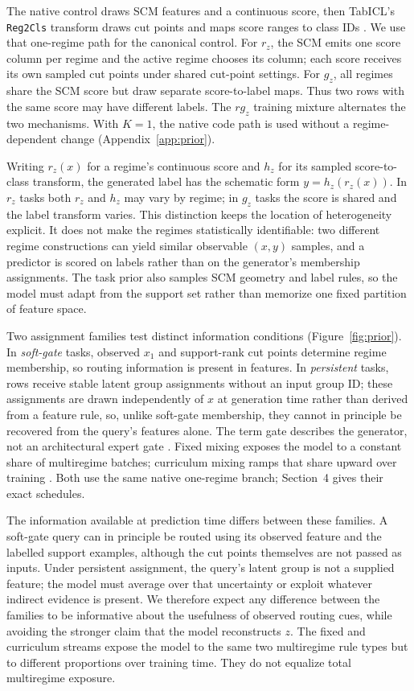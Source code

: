 \documentclass{article}
\begin{document}
The native control draws SCM features and a continuous score, then TabICL's \texttt{Reg2Cls} transform draws cut points and maps score ranges to class IDs \citep{qu2025tabicl}. We use that one-regime path for the canonical control. For $r_z$, the SCM emits one score column per regime and the active regime chooses its column; each score receives its own sampled cut points under shared cut-point settings. For $g_z$, all regimes share the SCM score but draw separate score-to-label maps. Thus two rows with the same score may have different labels. The $rg_z$ training mixture alternates the two mechanisms. With $K=1$, the native code path is used without a regime-dependent change (Appendix~\ref{app:prior}).

Writing $r_z(x)$ for a regime's continuous score and $h_z$ for its sampled score-to-class transform, the generated label has the schematic form $y=h_z(r_z(x))$. In $r_z$ tasks both $r_z$ and $h_z$ may vary by regime; in $g_z$ tasks the score is shared and the label transform varies. This distinction keeps the location of heterogeneity explicit. It does not make the regimes statistically identifiable: two different regime constructions can yield similar observable $(x,y)$ samples, and a predictor is scored on labels rather than on the generator's membership assignments. The task prior also samples SCM geometry and label rules, so the model must adapt from the support set rather than memorize one fixed partition of feature space.

Two assignment families test distinct information conditions (Figure~\ref{fig:prior}). In \emph{soft-gate} tasks, observed $x_1$ and support-rank cut points determine regime membership, so routing information is present in features. In \emph{persistent} tasks, rows receive stable latent group assignments without an input group ID; these assignments are drawn independently of $x$ at generation time rather than derived from a feature rule, so, unlike soft-gate membership, they cannot in principle be recovered from the query's features alone. The term gate describes the generator, not an architectural expert gate \citep{jacobs1991experts,jordan1994hierarchical}. Fixed mixing exposes the model to a constant share of multiregime batches; curriculum mixing ramps that share upward over training \citep{bengio2009curriculum}. Both use the same native one-regime branch; Section~4 gives their exact schedules.

The information available at prediction time differs between these families. A soft-gate query can in principle be routed using its observed feature and the labelled support examples, although the cut points themselves are not passed as inputs. Under persistent assignment, the query's latent group is not a supplied feature; the model must average over that uncertainty or exploit whatever indirect evidence is present. We therefore expect any difference between the families to be informative about the usefulness of observed routing cues, while avoiding the stronger claim that the model reconstructs $z$. The fixed and curriculum streams expose the model to the same two multiregime rule types but to different proportions over training time. They do not equalize total multiregime exposure.
\end{document}
